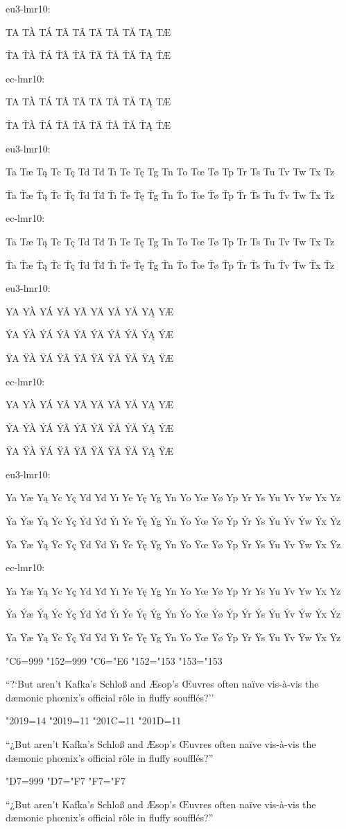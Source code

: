 eu3-lmr10:

TA TÀ TÁ TÂ TÃ TÄ TÅ TĂ TĄ TÆ

ŤA ŤÀ ŤÁ ŤÂ ŤÃ ŤÄ ŤÅ ŤĂ ŤĄ ŤÆ

{
\eclmr

ec-lmr10:

TA TÀ TÁ TÂ TÃ TÄ TÅ TĂ TĄ TÆ

ŤA ŤÀ ŤÁ ŤÂ ŤÃ ŤÄ ŤÅ ŤĂ ŤĄ ŤÆ
}

eu3-lmr10:

Ta Tæ Tą Tc Tç Td Tđ Tı Te Tę Tg Tn To Tœ Tø Tp Tr Ts Tu Tv Tw Tx Tz

Ťa Ťæ Ťą Ťc Ťç Ťd Ťđ Ťı Ťe Ťę Ťg Ťn Ťo Ťœ Ťø Ťp Ťr Ťs Ťu Ťv Ťw Ťx Ťz

{
\eclmr

ec-lmr10:

Ta Tæ Tą Tc Tç Td Tđ Tı Te Tę Tg Tn To Tœ Tø Tp Tr Ts Tu Tv Tw Tx Tz

Ťa Ťæ Ťą Ťc Ťç Ťd Ťđ Ťı Ťe Ťę Ťg Ťn Ťo Ťœ Ťø Ťp Ťr Ťs Ťu Ťv Ťw Ťx Ťz
}

eu3-lmr10:

YA YÀ YÁ YÂ YÃ YÄ YÅ YĂ YĄ YÆ

ÝA ÝÀ ÝÁ ÝÂ ÝÃ ÝÄ ÝÅ ÝĂ ÝĄ ÝÆ

ŸA ŸÀ ŸÁ ŸÂ ŸÃ ŸÄ ŸÅ ŸĂ ŸĄ ŸÆ

{
\eclmr

ec-lmr10:

YA YÀ YÁ YÂ YÃ YÄ YÅ YĂ YĄ YÆ

ÝA ÝÀ ÝÁ ÝÂ ÝÃ ÝÄ ÝÅ ÝĂ ÝĄ ÝÆ

ŸA ŸÀ ŸÁ ŸÂ ŸÃ ŸÄ ŸÅ ŸĂ ŸĄ ŸÆ
}

eu3-lmr10:

Ya Yæ Yą Yc Yç Yd Yđ Yı Ye Yę Yg Yn Yo Yœ Yø Yp Yr Ys Yu Yv Yw Yx Yz

Ýa Ýæ Ýą Ýc Ýç Ýd Ýđ Ýı Ýe Ýę Ýg Ýn Ýo Ýœ Ýø Ýp Ýr Ýs Ýu Ýv Ýw Ýx Ýz

Ÿa Ÿæ Ÿą Ÿc Ÿç Ÿd Ÿđ Ÿı Ÿe Ÿę Ÿg Ÿn Ÿo Ÿœ Ÿø Ÿp Ÿr Ÿs Ÿu Ÿv Ÿw Ÿx Ÿz

{
\eclmr

ec-lmr10:

Ya Yæ Yą Yc Yç Yd Yđ Yı Ye Yę Yg Yn Yo Yœ Yø Yp Yr Ys Yu Yv Yw Yx Yz

Ýa Ýæ Ýą Ýc Ýç Ýd Ýđ Ýı Ýe Ýę Ýg Ýn Ýo Ýœ Ýø Ýp Ýr Ýs Ýu Ýv Ýw Ýx Ýz

Ÿa Ÿæ Ÿą Ÿc Ÿç Ÿd Ÿđ Ÿı Ÿe Ÿę Ÿg Ÿn Ÿo Ÿœ Ÿø Ÿp Ÿr Ÿs Ÿu Ÿv Ÿw Ÿx Ÿz
}

\sfcode"C6=999
\sfcode"152=999
\lccode"C6="E6 %
\lccode"152="153 %
\lccode"153="153

``?`But aren't Kafka's Schloß and Æsop's Œuvres
often naïve vis-à-vis the dæmonic phœnix's official rôle
in fluffy soufflés?''

\kcatcode"2019=14
\catcode"2019=11
\catcode"201C=11
\catcode"201D=11

“¿But aren’t Kafka’s Schloß and Æsop’s Œuvres
often naïve vis-à-vis the dæmonic phœnix’s official rôle
in fluffy soufflés?”

{
\eclmr
\sfcode"D7=999
\lccode"D7="F7 %
\lccode"F7="F7

“¿But aren’t Kafka’s Schloß and Æsop’s Œuvres
often naïve vis-à-vis the dæmonic phœnix’s official rôle
in fluffy soufflés?”
}

\bye
